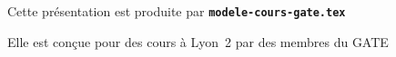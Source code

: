 
  \item Cette présentation est produite par \texttt{\textbf{modele-cours-gate.tex}}
  \item Elle est conçue pour des cours à Lyon~2 par des membres du GATE
